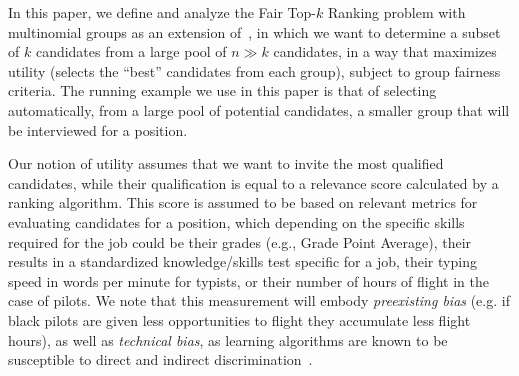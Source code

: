 In this paper, we define and analyze the {\sc Fair Top-$k$ Ranking problem} with multinomial groups as an extension of~\cite{zehlike2017fair}, in which we want to determine a subset of $k$ candidates from a large pool of $n \gg k$ candidates, in a way that maximizes utility (selects the ``best'' candidates from each group), subject to group fairness criteria. 
%
The running example we use in this paper is that of selecting automatically, from a large pool of potential candidates, a smaller group that will be interviewed for a position.

Our notion of utility assumes that we want to invite the most qualified candidates, while their qualification is equal to a relevance score calculated by a ranking algorithm.
%
This score is assumed to be based on relevant metrics for evaluating candidates for a position, which depending on the specific skills required for the job could be their grades (e.g., Grade Point Average), their results in a standardized knowledge/skills test specific for a job, their typing speed in words per minute for typists, or their number of hours of flight in the case of pilots.
%
We note that this measurement will embody \emph{preexisting bias} (e.g. if black pilots are given less opportunities to flight they accumulate less flight hours), as well as \emph{technical bias}, as learning algorithms are known to be susceptible to direct and indirect discrimination~\cite{tuto2016,HajianFerrer12}.

